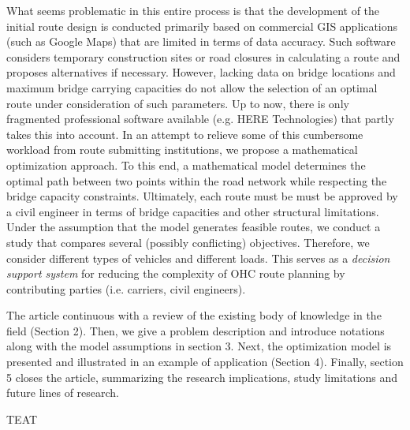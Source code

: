 What seems problematic in this entire process is that the development of the initial route design is conducted primarily based on commercial GIS applications (such as Google Maps) that are limited in terms of data accuracy.
Such software considers temporary construction sites or road closures in calculating a route and proposes alternatives if necessary.
However, lacking data on bridge locations and maximum bridge carrying capacities do not allow the selection of an optimal route under consideration of such parameters.
Up to now, there is only fragmented professional software available (e.g. HERE Technologies) that partly takes this into account.
In an attempt to relieve some of this cumbersome workload from route submitting institutions, we propose a mathematical optimization approach.
To this end, a mathematical model determines the optimal path between two points within the road network while respecting the bridge capacity constraints.
Ultimately, each route must be must be approved by a civil engineer in terms of bridge capacities and other structural limitations. Under the assumption that the model generates feasible routes, we conduct a study that compares several (possibly conflicting) objectives.
Therefore, we consider different types of vehicles and different loads. This serves as a \textit{decision support system} for reducing the complexity of OHC route planning by contributing parties (i.e. carriers, civil engineers).
\par
The article continuous with a review of the existing body of knowledge in the field (Section 2).
Then, we give a problem description and introduce notations along with the model assumptions in section 3. Next, the optimization model is presented and illustrated in an example of application (Section 4).
Finally, section 5 closes the article, summarizing the research implications, study limitations and future lines of research.

TEAT


